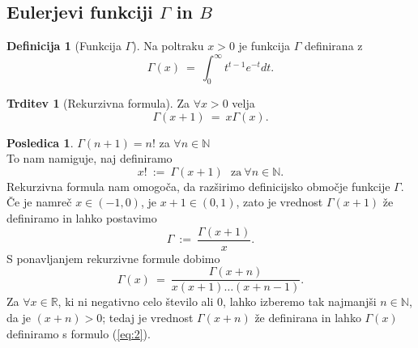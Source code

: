 \documentclass[11pt]{article}
\theoremstyle{definition}
\newtheorem{definicija}{Definicija}[section]
\theoremstyle{definition}
\newtheorem{trditev}{Trditev}[section]
\theoremstyle{definition}
\newtheorem*{posledica}{Posledica}
\begin{document}
\subsection{Eulerjevi funkciji $\Gamma$ in $B$}
\vspace{0.5cm}

\begin{definicija}[Funkcija $\Gamma$]

Na poltraku $x > 0$ je funkcija $\Gamma$ definirana z
\begin{equation}
	\Gamma(x) ~=~ \int_0^{\infty} t^{t-1} e^{-t} dt.
\end{equation}

\end{definicija}
\vspace{0.5cm}

\begin{trditev}[Rekurzivna formula]

Za $\forall x > 0$ velja
$$\Gamma(x + 1) ~=~ x \Gamma(x).$$

\end{trditev}
\vspace{0.5cm}

\begin{posledica}

$\Gamma(n + 1) = n!$ za $\forall n \in \mathbb{N}$ \\

\noindent To nam namiguje, naj definiramo
$$x! ~:=~ \Gamma(x + 1) ~~~\text{za}~ \forall n \in \mathbb{N}.$$
Rekurzivna formula nam omogoča, da razširimo definicijsko območje funkcije $\Gamma$. Če je namreč $x \in (-1, 0)$, je $x + 1 \in  (0, 1)$, zato je vrednost $\Gamma(x + 1)$ že definiramo in lahko postavimo
$$\Gamma ~:=~ \frac{\Gamma(x+1)}{x}.$$
S ponavljanjem rekurzivne formule dobimo
\begin{equation} \label{eq:2}
	\Gamma(x) ~=~ \frac{\Gamma(x+n)}{x(x+1)\ldots(x+n-1)}.
\end{equation}
Za $\forall x \in \mathbb{R}$, ki ni negativno celo število ali $0$, lahko izberemo tak najmanjši $n \in \mathbb{N}$, da je $(x + n) > 0$; tedaj je vrednost $\Gamma(x + n)$ že definirana in lahko $\Gamma(x)$ definiramo s formulo (\ref{eq:2}).

\end{posledica}
\vspace{0.5cm}
\end{document}
